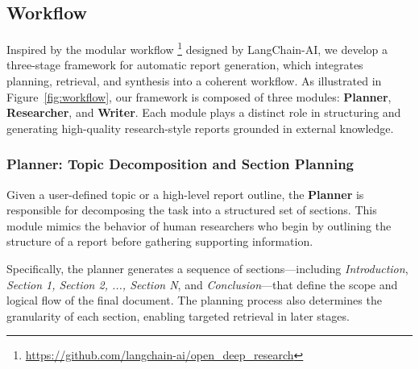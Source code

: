 \documentclass[11pt]{article}
\begin{document}
\subsection{Workflow} %

Inspired by the modular workflow \footnote{\url{https://github.com/langchain-ai/open_deep_research}} designed by LangChain-AI, we develop a three-stage framework for automatic report generation, which integrates planning, retrieval, and synthesis into a coherent workflow. As illustrated in Figure~\ref{fig:workflow}, our framework is composed of three modules: \textbf{Planner}, \textbf{Researcher}, and \textbf{Writer}. Each module plays a distinct role in structuring and generating high-quality research-style reports grounded in external knowledge.


\subsubsection{Planner: Topic Decomposition and Section Planning}
Given a user-defined topic or a high-level report outline, the \textbf{Planner} is responsible for decomposing the task into a structured set of sections. This module mimics the behavior of human researchers who begin by outlining the structure of a report before gathering supporting information.

Specifically, the planner generates a sequence of sections---including \textit{Introduction}, \textit{Section 1, Section 2, ..., Section N}, and \textit{Conclusion}---that define the scope and logical flow of the final document. The planning process also determines the granularity of each section, enabling targeted retrieval in later stages.

\end{document}
